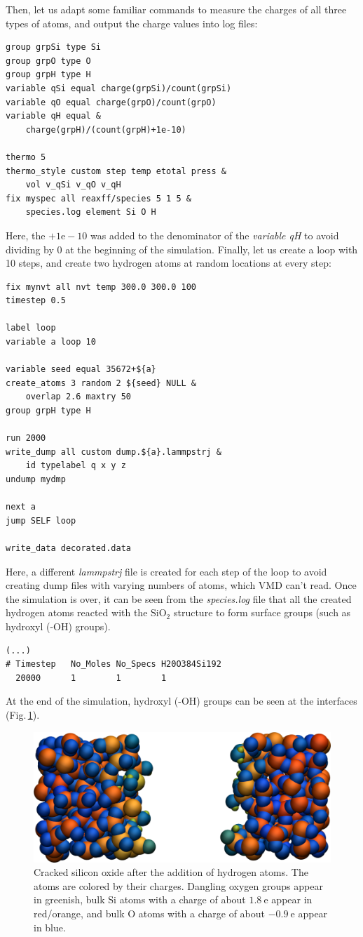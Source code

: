 \documentclass[9pt,tutorial]{livecoms}
\begin{document}
Then, let us adapt some familiar commands to measure the charges of all three
types of atoms, and output the charge values into log files:
\begin{lstlisting}
group grpSi type Si
group grpO type O
group grpH type H
variable qSi equal charge(grpSi)/count(grpSi)
variable qO equal charge(grpO)/count(grpO)
variable qH equal &
    charge(grpH)/(count(grpH)+1e-10)

thermo 5
thermo_style custom step temp etotal press &
    vol v_qSi v_qO v_qH
fix myspec all reaxff/species 5 1 5 &
    species.log element Si O H
\end{lstlisting}
Here, the $+1\text{e}-10$ was added to the denominator of the \textit{variable qH}
to avoid dividing by 0 at the beginning of the simulation. Finally, let us
create a loop with 10 steps, and create two hydrogen atoms at random locations at
every step:
\begin{lstlisting}
fix mynvt all nvt temp 300.0 300.0 100
timestep 0.5

label loop
variable a loop 10

variable seed equal 35672+${a}
create_atoms 3 random 2 ${seed} NULL &
    overlap 2.6 maxtry 50
group grpH type H

run 2000
write_dump all custom dump.${a}.lammpstrj &
    id typelabel q x y z
undump mydmp

next a
jump SELF loop

write_data decorated.data
\end{lstlisting}
Here, a different \textit{lammpstrj} file is created for each step of the loop
to avoid creating dump files with varying numbers of atoms, which VMD can't read.
Once the simulation is over, it can be seen from the \textit{species.log} file that
all the created hydrogen atoms reacted with the $\text{SiO}_{2}$ structure to
form surface groups (such as hydroxyl (-OH) groups).
\begin{lstlisting}
(...)
# Timestep   No_Moles No_Specs H20O384Si192
  20000      1        1        1
\end{lstlisting}
At the end of the simulation, hydroxyl (-OH) groups can be seen at the interfaces
(Fig.\,\ref{fig:SIO-decorated}).

\begin{figure}
\includegraphics[width=\linewidth]{SIO-decorated}
\caption{Cracked silicon oxide after the addition of hydrogen atoms. The atoms
are colored by their charges. Dangling oxygen groups appear in greenish, bulk
Si atoms with a charge of about $1.8~\text{e}$  appear in red/orange, and bulk
O atoms with a charge of about $-0.9 ~ \text{e}$ appear in blue.}
\label{fig:SIO-decorated}
\end{figure}
\end{document}
